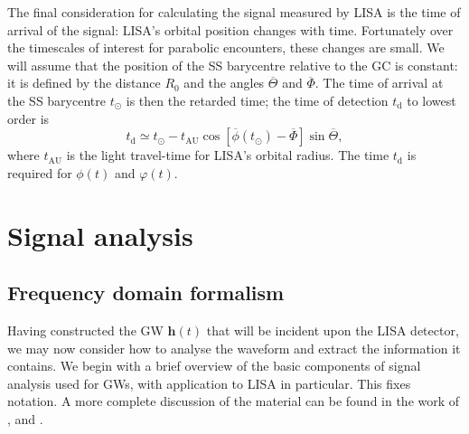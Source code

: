 \documentclass[useAMS,usedcolumn,usegraphicx,usenatbib]{mn2e}
\newcommand{\sub}[1]{\ensuremath{_\mathrm{#1}}}
\begin{document}
The final consideration for calculating the signal measured by LISA is the time of arrival of the signal: LISA's orbital position changes with time. Fortunately over the timescales of interest for parabolic encounters, these changes are small. We will assume that the position of the SS barycentre relative to the GC is constant: it is defined by the distance $R_0$ and the angles $\overline{\Theta}$ and $\overline{\Phi}$. The time of arrival at the SS barycentre $t_\odot$ is then the retarded time; the time of detection $t\sub{d}$ to lowest order is
\begin{equation}
t\sub{d} \simeq t_\odot - t\sub{AU}\cos\left[\overline{\phi}(t_\odot) - \overline{\Phi}\right]\sin\overline{\Theta},
\end{equation}
where $t\sub{AU}$ is the light travel-time for LISA's orbital radius. The time $t\sub{d}$ is required for $\phi(t)$ and $\varphi(t)$.

\section{Signal analysis}\label{sec:Signal}

\subsection{Frequency domain formalism}

Having constructed the GW $\boldsymbol{h}(t)$ that will be incident upon the LISA detector, we may now consider how to analyse the waveform and extract the information it contains. We begin with a brief overview of the basic components of signal analysis used for GWs, with application to LISA in particular. This fixes notation. A more complete discussion of the material can be found in the work of \citet{Finn1992}, and \citet{Cutler1994}.
\end{document}
